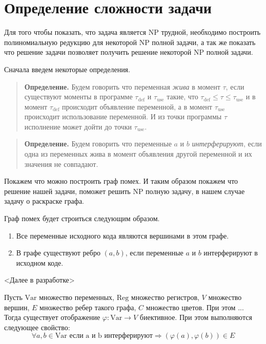 \documentclass[12pt]{article}
\begin{document}
\section{Определение сложности задачи}
\label{seg:complexity}
Для того чтобы показать, что задача является NP трудной, необходимо построить полиномиальную редукцию
для некоторой NP полной задачи, а так же показать что решение задачи позволяет получить решение некоторой
NP полной задачи.

Сначала введем некоторые определения.


\begin{quote}
    \textbf{Определение.}
    Будем говорить что переменная \textit{жива} в момент $\tau$, если существуют моменты в программе $\tau_{\text{def}}$ и
    $\tau_{\text{use}}$ такие, что $\tau_{\text{def}} \leq \tau \leq \tau_{\text{use}}$ и в момент $\tau_{\text{def}}$ происходит
    объявление переменной, а в момент $\tau_{\text{use}}$ происходит использование переменной. И из точки программы $\tau$
    исполнение может дойти до точки $\tau_{\text{use}}$.
\end{quote}

\begin{quote}
    \textbf{Определение.}
    Будем говорить что переменные $a$ и $b$ \textit{интерферируют}, если одна из переменных жива в момент объявления
    другой переменной и их значения не совпадают.
\end{quote}

Покажем что можно построить граф помех. И таким образом покажем что решение нашей задачи, поможет решить
NP полную задачу, в нашем случае задачу о раскраске графа.

Граф помех будет строиться следующим образом.
\begin{enumerate}
    \item Все переменные исходного кода являются вершинами в этом графе.
    \item В графе существуют ребро $(a, b)$, если переменные $a$ и $b$ интерферируют в исходном коде.
\end{enumerate}


<Далее в разработке>

Пусть $\text{Var}$ множество переменных, $\text{Reg}$ множество регистров, $V$ множество вершин, $E$
множество ребер такого графа, $C$ множество цветов. При этом ...
Тогда существует отображение $\varphi: \text{Var} \to V$ биективное. При этом выполняются следующее свойство:
$$\forall a, b \in \text{Var} \text{ если a и b интерферируют}  \Rightarrow (\varphi(a), \varphi(b)) \in E$$
\end{document}
